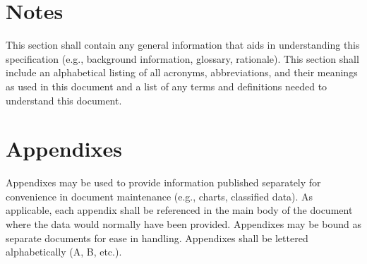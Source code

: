\documentclass{fidata-report-template}
\begin{document}
\section{Notes}

This section shall contain any general information that aids in
understanding this specification (e.g., background information,
glossary, rationale). This section shall include an alphabetical listing
of all acronyms, abbreviations, and their meanings as used in this
document and a list of any terms and definitions needed to understand
this document.

\appendix

\section{Appendixes}

Appendixes may be used to provide information published separately for
convenience in document maintenance (e.g., charts, classified data). As
applicable, each appendix shall be referenced in the main body of the
document where the data would normally have been provided. Appendixes
may be bound as separate documents for ease in handling. Appendixes
shall be lettered alphabetically (A, B, etc.).
\end{document}
